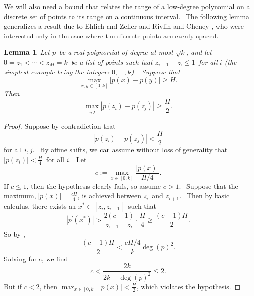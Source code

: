 \documentclass[10pt,a4paper]{article}
\newtheorem{lemma}[theorem]{Lemma}
\newcommand{\<}{\langle}
\renewcommand{\>}{\rangle}
\begin{document}
We will also need a bound that relates the range of a low-degree polynomial
on a discrete set of points to its range on a continuous interval. \ The
following lemma generalizes a result due to Ehlich and Zeller \cite{ez} and
Rivlin and Cheney \cite{rc}, who were interested only in the case where the
discrete points are evenly spaced.

\begin{lemma}
\label{ezrclem}Let $p$\ be a real polynomial of degree at most $\sqrt{k}$,
and let $0=z_{1}<\cdots<z_{M}=k$\ be a list of points such that $
z_{i+1}-z_{i}\leq1$\ for all $i$ (the simplest example being the integers $
0,\ldots,k$). \ Suppose that
\begin{equation}
\max_{x,y\in\left[ 0,k\right] }\left\vert p\left( x\right) -p\left( y\right)
\right\vert \geq H.
\end{equation}
Then
\begin{equation}
\max_{i,j}\left\vert p\left( z_{i}\right) -p\left( z_{j}\right) \right\vert
\geq\frac{H}{2}.
\end{equation}
\end{lemma}

\begin{proof}
Suppose by contradiction that
\begin{equation}
\left\vert p\left(  z_{i}\right)  -p\left(  z_{j}\right)  \right\vert
<\frac{H}{2}
\end{equation}
for all $i,j$. \ By affine shifts, we can assume without loss of generality
that $\left\vert p\left(  z_{i}\right)  \right\vert <\frac{H}{4}$\ for all
$i$. \ Let
\begin{equation}
c:=\max_{x\in\left[  0,k\right]  }\frac{\left\vert p\left(  x\right)
\right\vert }{H/4}.
\end{equation}
If $c\leq1$, then the hypothesis clearly fails, so assume $c>1$. \ Suppose
that the maximum, $\left\vert p\left(  x\right)  \right\vert =\frac{cH}{4}$,
is achieved between $z_{i}$\ and $z_{i+1}$. \ Then by basic calculus, there
exists an $x^{\ast}\in\left[  z_{i},z_{i+1}\right]  $\ such that
\begin{equation}
\left\vert p^{\prime}\left(  x^{\ast}\right)  \right\vert >\frac{2\left(
c-1\right)  }{z_{i+1}-z_{i}}\cdot\frac{H}{4}\geq\frac{\left(  c-1\right)
H}{2}.
\end{equation}
So by ,
\begin{equation}
\frac{\left(  c-1\right)  H}{2}<\frac{cH/4}{k}\deg\left(  p\right)  ^{2}.
\end{equation}
Solving for $c$, we find
\begin{equation}
c<\frac{2k}{2k-\deg\left(  p\right)  ^{2}}\leq2.
\end{equation}
But if $c<2$, then $\max_{x\in\left[  0,k\right]  }\left\vert p\left(
x\right)  \right\vert <\frac{H}{2}$, which violates the hypothesis.
\end{proof}
\end{document}
